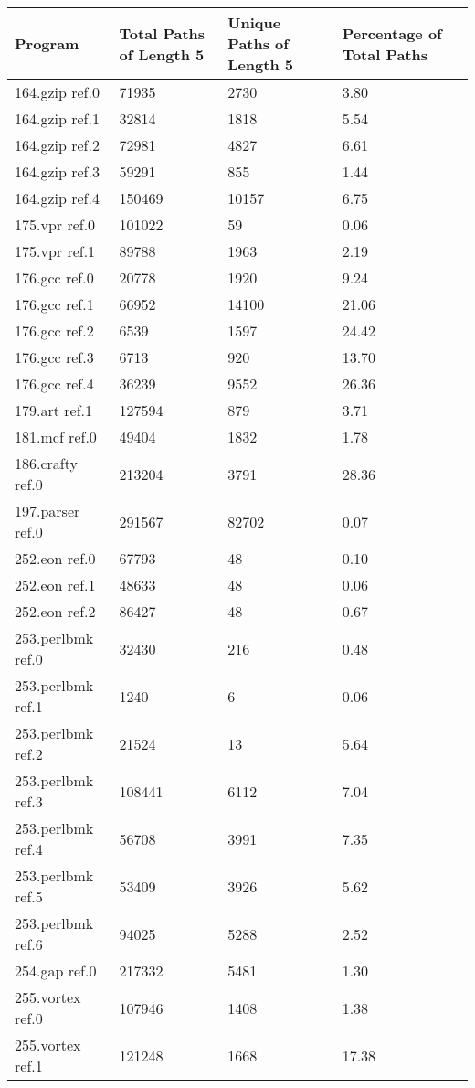 \begin{table}[t!]
\footnotesize
\center
\begin{tabular}{|p{1.3in}|p{1.0in}|p{1.0in}|p{1.0in}|}
\hline
Program&Total Paths of Length 5&Unique Paths of Length 5&Percentage of Total Paths\\
\hline\hline
164.gzip ref.0&71935&2730&3.80\\
\hline
164.gzip ref.1&32814&1818&5.54\\
\hline
164.gzip ref.2&72981&4827&6.61\\
\hline
164.gzip ref.3&59291&855&1.44\\
\hline
164.gzip ref.4&150469&10157&6.75\\
\hline
175.vpr ref.0&101022&59&0.06\\
\hline
175.vpr ref.1&89788&1963&2.19\\
\hline
176.gcc ref.0&20778&1920&9.24\\
\hline
176.gcc ref.1&66952&14100&21.06\\
\hline
176.gcc ref.2&6539&1597&24.42\\
\hline
176.gcc ref.3&6713&920&13.70\\
\hline
176.gcc ref.4&36239&9552&26.36\\
\hline
179.art ref.1&127594&879&3.71\\
\hline
181.mcf ref.0&49404&1832&1.78\\
\hline
186.crafty ref.0&213204&3791&28.36\\
\hline
197.parser ref.0&291567&82702&0.07\\
\hline
252.eon ref.0&67793&48&0.10\\
\hline
252.eon ref.1&48633&48&0.06\\
\hline
252.eon ref.2&86427&48&0.67\\
\hline
253.perlbmk ref.0&32430&216&0.48\\
\hline
253.perlbmk ref.1&1240&6&0.06\\
\hline
253.perlbmk ref.2&21524&13&5.64\\
\hline
253.perlbmk ref.3&108441&6112&7.04\\
\hline
253.perlbmk ref.4&56708&3991&7.35\\
\hline
253.perlbmk ref.5&53409&3926&5.62\\
\hline
253.perlbmk ref.6&94025&5288&2.52\\
\hline
254.gap ref.0&217332&5481&1.30\\
\hline
255.vortex ref.0&107946&1408&1.38\\
\hline
255.vortex ref.1&121248&1668&17.38\\

\end{tabular}
\end{table}
